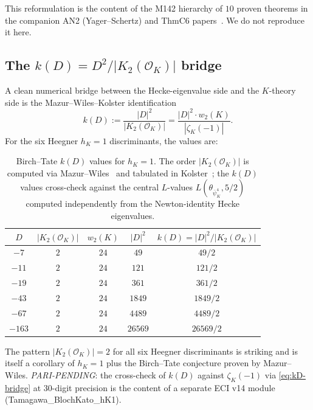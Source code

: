 \documentclass[11pt,a4paper]{amsart}
\theoremstyle{definition}
\newcommand{\OK}{\mathcal{O}_K}
\newcommand{\hK}{h_{K}}
\begin{document}
This reformulation is the content of the M142 hierarchy of $10$ proven theorems in the companion AN2 (Yager--Schertz) and ThmC6 papers~\cite{AN2YS2026, ThmC6FN2026}. We do not reproduce it here.

\subsection{The $k(D) = D^2 / |K_2(\OK)|$ bridge}\label{sec:kD-bridge}

A clean numerical bridge between the Hecke-eigenvalue side and the $K$-theory side is the Mazur--Wiles--Kolster identification
\begin{equation}\label{eq:kD-bridge}
k(D) := \frac{|D|^2}{|K_2(\OK)|} = \frac{|D|^2 \cdot w_2(K)}{|\zeta_K(-1)|}.
\end{equation}
For the six Heegner $\hK = 1$ discriminants, the values are:

\begin{table}[h]
\centering
\caption{Birch--Tate $k(D)$ values for $\hK = 1$. The order $|K_2(\OK)|$ is computed via Mazur--Wiles~\cite{MazurWiles1984} and tabulated in Kolster~\cite{Kolster1989}; the $k(D)$ values cross-check against the central $L$-values $L(\theta_{\bar\psi_K^4}, 5/2)$ computed independently from the Newton-identity Hecke eigenvalues.}
\label{tab:kD-values}
\begin{tabular}{ccccc}
\toprule
$D$ & $|K_2(\OK)|$ & $w_2(K)$ & $|D|^2$ & $k(D) = |D|^2 / |K_2(\OK)|$ \\
\midrule
$-7$ & $2$ & $24$ & $49$ & $49/2$ \\
$-11$ & $2$ & $24$ & $121$ & $121/2$ \\
$-19$ & $2$ & $24$ & $361$ & $361/2$ \\
$-43$ & $2$ & $24$ & $1849$ & $1849/2$ \\
$-67$ & $2$ & $24$ & $4489$ & $4489/2$ \\
$-163$ & $2$ & $24$ & $26569$ & $26569/2$ \\
\bottomrule
\end{tabular}
\end{table}

The pattern $|K_2(\OK)| = 2$ for all six Heegner discriminants is striking and is itself a corollary of $\hK = 1$ plus the Birch--Tate conjecture proven by Mazur--Wiles. \emph{PARI-PENDING}: the cross-check of $k(D)$ against $\zeta_K(-1)$ via \eqref{eq:kD-bridge} at 30-digit precision is the content of a separate ECI v14 module (Tamagawa\_BlochKato\_hK1).
\end{document}
